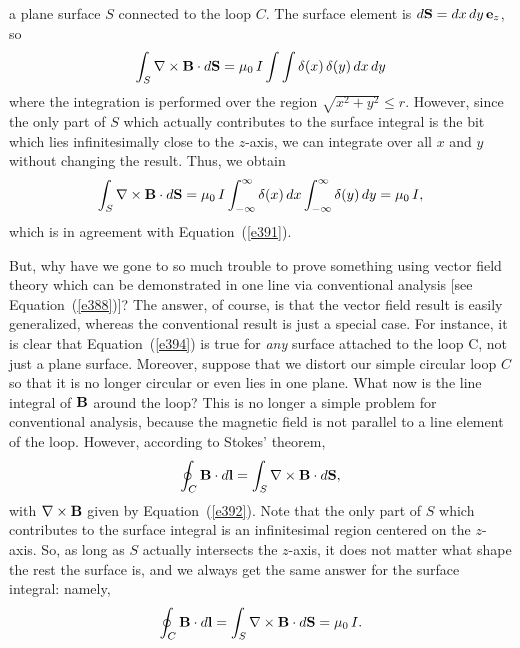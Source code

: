 a plane surface $S$ connected to the loop $C$. The surface element is
$d{\bf S} = dx\,dy\,{\bf e}_z$, so
\begin{equation}
\int_S \nabla\times{\bf B} \cdot d{\bf S} = \mu_0 \,I \int\int
 \delta(x)\,\delta(y)\, dx\,dy
\end{equation}
where the integration is performed over the region $\sqrt{x^2+ y^2} \leq r$. 
However, since the  only part  of $S$ which actually
contributes to the surface integral is the bit which 
lies infinitesimally close to the $z$-axis, we can integrate over all $x$ and $y$
without changing the result. Thus, we obtain
\begin{equation}
\int_S \nabla\times{\bf B} \cdot d{\bf S} = \mu_0\, I \int_{-\infty}^\infty
\delta(x)\, dx\int_{-\infty}^{\infty}
\delta(y)\,dy = \mu_0\, I,\label{e394}
\end{equation}
which is in agreement with Equation~(\ref{e391}). 

But, why  have we gone to so much trouble to prove 
something using vector field theory which can be demonstrated
 in one line via conventional
analysis [see Equation~(\ref{e388})]? The answer, of course, is that the vector field
result is easily generalized, whereas the
conventional result is just  a special case.
For instance, it is clear that Equation~(\ref{e394}) is true for {\em any}\/ surface attached to the loop
C, not just a plane surface.
 Moreover, suppose that we distort our simple circular loop $C$
so that it is no longer circular or even lies in one plane.
 What now is the line integral
of ${\bf B}$ around the loop? This is no longer a simple problem for conventional
analysis, because the magnetic field is not parallel to a line element of the
loop. 
However, according to Stokes' theorem,
\begin{equation}
\oint_C {\bf B} \cdot d{\bf l} = \int_S \nabla\times{\bf B} \cdot d{\bf S},
\end{equation}
with $\nabla\times{\bf B}$ given by Equation~(\ref{e392}). Note that the only part of 
 $S$ which contributes to the surface integral is an infinitesimal region
centered on the $z$-axis. So, as long as 
$S$ actually intersects the $z$-axis,
it does not matter what shape the rest the surface is, and we  always get the same answer
for the surface integral: namely,
\begin{equation}
\oint_C {\bf B}\cdot d{\bf l} = \int_S \nabla\times{\bf B} \cdot d{\bf S}
=\mu_0\, I.
\end{equation}

